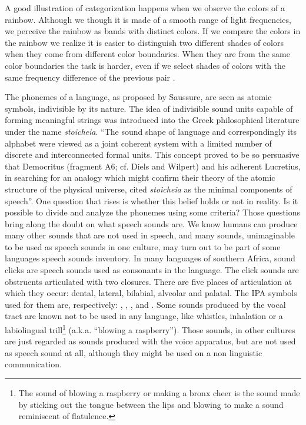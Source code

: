 A good illustration of categorization happens when we observe the colors of a rainbow. Although we though it
is made of a smooth range of light frequencies, we perceive the rainbow as bands with distinct colors.
If we compare the colors in the rainbow we realize it is easier to distinguish two different shades of colors 
when they come from different color boundaries. When they are from the same color boundaries the task
is harder, even if we select shades of colors with the same frequency difference of the previous pair \citep{korda1984}.

The phonemes of a language, as proposed by Saussure, are seen as atomic symbols, indivisible by its nature. The idea of indivisible sound units capable of forming meaningful strings was introduced into the Greek philosophical literature under the name \textit{stoicheia}. ``The sound shape of language and correspondingly its alphabet were viewed as a joint coherent system with a limited number of discrete and interconnected formal units. This concept proved to be so persuasive that Democritus (fragment A6; cf. Diels and Wilpert) and his adherent Lucretius, in searching for an analogy which might confirm their theory of the atomic structure of the physical universe, cited \textit{stoicheia} as the minimal components of speech''\citep{jakobson2002}. One question that rises is whether this belief holds or not in reality. Is it possible to divide and analyze the phonemes using some criteria? Those questions bring along the doubt on what speech sounds are. We know humans can produce many other sounds that are not used in speech, and many sounds, unimaginable to be used as speech sounds in one culture, may turn out to be part of some languages speech sounds inventory. In many languages of southern Africa, sound clicks are speech sounds used as consonants in the language. The click sounds are obstruents articulated with two closures. There are five places of articulation at which they occur: dental, lateral, bilabial, alveolar and palatal. The IPA symbols used for them are, respectively: \textipa{[|]}, \textipa{[||]}, \textipa{[\!o]}, \textipa{[!]} and \textipa{[\textdoublebarpipe]}. Some sounds produced by the vocal tract are known not to be used in any language, like whistles, inhalation or a labiolingual trill\footnote{The sound of blowing a raspberry or making a bronx cheer is the sound made by sticking out the tongue between the lips and blowing to make a sound reminiscent of flatulence.} (a.k.a. ``blowing a raspberry''). Those sounds, in other cultures are just regarded as sounds produced with the voice apparatus, 
but are not used as speech sound at all, although they might be used on a non linguistic communication.

